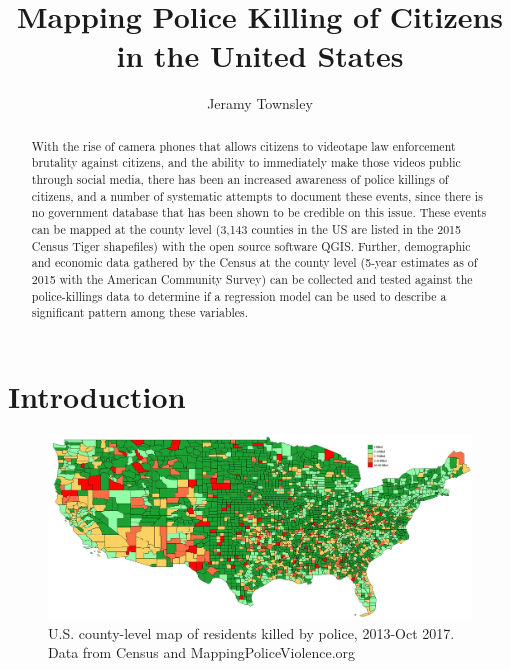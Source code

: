 \documentclass[sigconf]{acmart}
\begin{document}
\title{Mapping Police Killing of Citizens in the United States}

\author{Jeramy Townsley}


\begin{abstract}
With the rise of camera phones that allows citizens to videotape law enforcement brutality against citizens, and the ability to immediately make those videos public through social media, there has been an increased awareness of police killings of citizens, and a number of systematic attempts to document these events, since there is no government database that has been shown to be credible on this issue. These events can be mapped at the county level (3,143 counties in the US are listed in the 2015 Census Tiger shapefiles) with the open source software QGIS.  Further, demographic and economic data gathered by the Census at the county level (5-year estimates as of 2015 with the American Community Survey) can be collected and tested against the police-killings data to determine if a regression model can be used to describe a significant pattern among these variables. 
\end{abstract}


\maketitle

\section{Introduction}


\begin{figure}
\includegraphics[width=1.0\textwidth]{images/figure1.jpg}
\caption{U.S. county-level map of residents killed by police, 2013-Oct 2017.  Data from Census and MappingPoliceViolence.org}
\end{figure}
\end{document}
